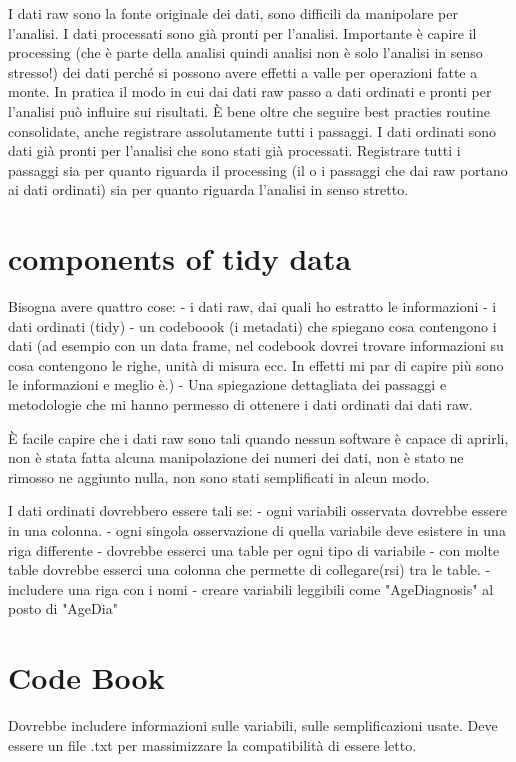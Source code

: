 I dati raw sono la fonte originale dei dati, sono difficili da manipolare per 
l'analisi.
I dati processati sono già pronti per l'analisi.
Importante è capire il processing (che è parte della analisi quindi analisi non è solo l'analisi in senso stresso!) dei dati perché si possono avere effetti a valle per operazioni fatte a monte. In pratica il modo in cui dai dati raw passo a dati ordinati 
e pronti per l'analisi può influire sui risultati.
È bene oltre che seguire best practies routine consolidate, anche registrare assolutamente
tutti i passaggi.
I dati ordinati sono dati già pronti per l'analisi che sono stati già processati.
Registrare tutti i passaggi sia per quanto riguarda il processing (il o i passaggi che dai raw portano ai dati ordinati) sia per quanto riguarda l'analisi in senso stretto.

\section{components of tidy data}

Bisogna avere quattro cose:
- i dati raw, dai quali ho estratto le informazioni
- i dati ordinati (tidy)
- un codeboook (i metadati) che spiegano cosa contengono i dati (ad esempio con un data frame, nel codebook dovrei trovare informazioni su cosa contengono le righe, unità di misura ecc. In effetti mi par di capire più sono le informazioni e meglio è.)
- Una spiegazione dettagliata dei passaggi e metodologie che mi hanno permesso di
ottenere i dati ordinati dai dati raw.

È facile capire che i dati raw sono tali quando nessun software è capace di aprirli, non è stata fatta alcuna manipolazione dei numeri dei dati, non è stato ne rimosso ne aggiunto nulla, non sono stati semplificati in alcun modo.

I dati ordinati dovrebbero essere tali se:
- ogni variabili osservata dovrebbe essere in una colonna.
- ogni singola osservazione di quella variabile deve esistere in una riga differente
- dovrebbe esserci una table per ogni tipo di variabile
- con molte table dovrebbe esserci una colonna che permette di collegare(rsi) tra le table.
- includere una riga con i nomi
- creare variabili leggibili come "AgeDiagnosis" al posto di "AgeDia"

\section{Code Book}
Dovrebbe includere informazioni sulle variabili, sulle semplificazioni usate.
Deve essere un file .txt per massimizzare la compatibilità di essere letto.

